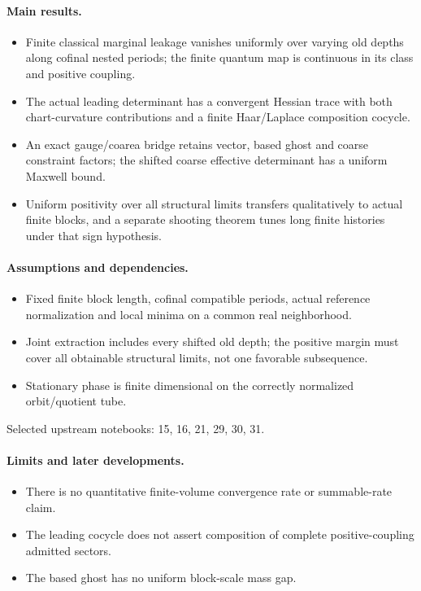 \documentclass[11pt]{article}
\theoremstyle{remark}
\begin{document}
\paragraph{Main results.}
\begin{itemize}
\item Finite classical marginal leakage vanishes uniformly over varying old depths along cofinal nested periods; the finite quantum map is continuous in its class and positive coupling.
\item The actual leading determinant has a convergent Hessian trace with both chart-curvature contributions and a finite Haar/Laplace composition cocycle.
\item An exact gauge/coarea bridge retains vector, based ghost and coarse constraint factors; the shifted coarse effective determinant has a uniform Maxwell bound.
\item Uniform positivity over all structural limits transfers qualitatively to actual finite blocks, and a separate shooting theorem tunes long finite histories under that sign hypothesis.
\end{itemize}

\paragraph{Assumptions and dependencies.}
\begin{itemize}
\item Fixed finite block length, cofinal compatible periods, actual reference normalization and local minima on a common real neighborhood.
\item Joint extraction includes every shifted old depth; the positive margin must cover all obtainable structural limits, not one favorable subsequence.
\item Stationary phase is finite dimensional on the correctly normalized orbit/quotient tube.
\end{itemize}

Selected upstream notebooks: 15, 16, 21, 29, 30, 31.\par

\paragraph{Limits and later developments.}
\begin{itemize}
\item There is no quantitative finite-volume convergence rate or summable-rate claim.
\item The leading cocycle does not assert composition of complete positive-coupling admitted sectors.
\item The based ghost has no uniform block-scale mass gap.
\end{itemize}
\end{document}
